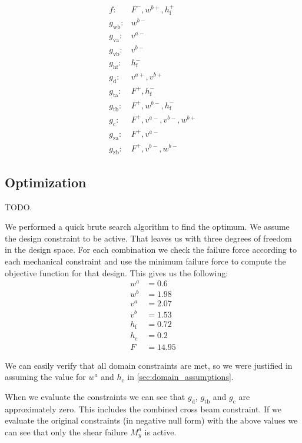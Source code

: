 \begin{align*}
	f: & F^-, w^{b+},  h_\text{f}^+\\
	g_\text{wb}: & w^{b-} \\
	g_\text{va}: & v^{a-} \\
	g_\text{vb}: & v^{b-} \\
	g_\text{hf}: & h_\text{f}^- \\
	g_\text{d}: & v^{a+}, v^{b+} \\
	g_\text{ta}: & F^+, h_\text{f}^- \\
	g_\text{tb}: & F^+, w^{b-}, h_\text{f}^- \\
	g_\text{c}: & F^+, v^{a-}, v^{b-}, w^{b+} \\
	g_\text{za}: & F^+, v^{a-} \\
	g_\text{zb}: & F^+, v^{b-}, w^{b-}
\end{align*}


\subsection{Optimization}

TODO.

We performed a quick brute search algorithm to find the optimum.
We assume the design constraint to be active.
That leaves us with three degrees of freedom in the design space.
For each combination we check the failure force according to each mechanical constraint 
and use the minimum failure force to compute the objective function for that design.
This gives us the following:
\begin{align*}
	w^a	&=0.6 \\
	w^b	&=1.98 \\
	v^a	&=2.07 \\
	v^b	&=1.53 \\
	h_\text{f}	&=0.72 \\
	h_\text{c}	&=0.2 \\
	F	&=14.95 
\end{align*}

We can easily verify that all domain constraints are met, so we were justified in assuming the value for $w^a$ and $h_\text{c}$ in \cref{sec:domain_assumptions}.

When we evaluate the constraints we can see that $g_\text{d}$, $g_\text{tb}$ and $g_\text{c}$ are approximately zero.
This includes the combined cross beam constraint.
If we evaluate the original constraints (in negative null form) with the above values we can see that only the shear failure $M_y^a$ is active.

